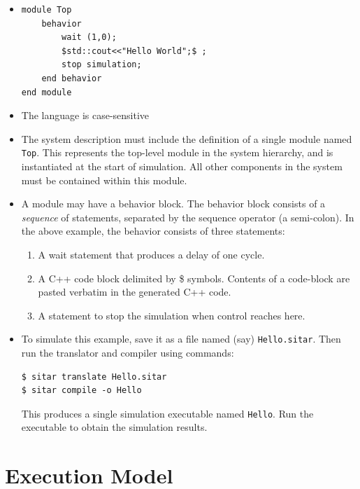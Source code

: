 \documentclass[12pt,a4paper]{report}
\begin{document}
\begin{itemize}
\item[] 
\begin{Verbatim}[frame=single]
module Top
    behavior
        wait (1,0);
        $std::cout<<"Hello World";$ ;
        stop simulation;
    end behavior
end module
\end{Verbatim}

\item The language is case-sensitive
\item The system description must include the definition 
of a single module named {\tt Top}. This represents the 
top-level module in the system hierarchy, and is instantiated
at the start of simulation. All other components in the system 
must be contained within this module.
\item A module may have a behavior block. The behavior block
consists of a {\em sequence} of statements, separated by the
sequence operator (a semi-colon). In the above example,
the behavior consists of three statements:

 \begin{enumerate}
 \item A wait statement that produces a delay of one cycle.
 \item A C++ code block delimited by \$ symbols. Contents of a code-block
 are pasted verbatim in the generated C++ code.
 \item A statement to stop the simulation when control reaches here.
 \end{enumerate}
 \item To simulate this example, save it as a file named (say) {\tt Hello.sitar}.
Then run the translator and compiler using commands:
\begin{Verbatim}[frame=single]
$ sitar translate Hello.sitar
$ sitar compile -o Hello
\end{Verbatim}
This produces a single simulation executable named {\tt Hello}. Run the executable
to obtain the simulation results.
\end{itemize} 



\chapter{Execution Model} \label{chap:execution_model}
\end{document}
